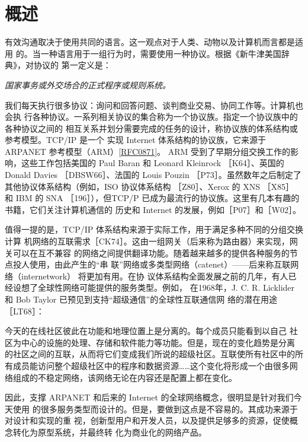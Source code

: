 \chapter{概述}

有效沟通取决于使用共同的语言。这一观点对于人类、动物以及计算机而言都是适用
的。当一种语言用于一组行为时，需要使用一种协议。根据《新牛津美国辞典》，对协议的
第一定义是：
\begin{center}
  \emph{国家事务或外交场合的正式程序或规则系统。}
\end{center}

我们每天执行很多协议：询问和回答问题、谈判商业交易、协同工作等。计算机也会执
行各种协议。一系列相关协议的集合称为一个协议族。指定一个协议族中的各种协议之间的
相互关系并划分需要完成的任务的设计，称协议族的体系结构或参考模型。TCP/IP 是一个
实现 Internet 体系结构的协议族，它来源于 ARPANET
参考模型（ARM）\href{https://www.rfc-editor.org/rfc/rfc0871}{[RFC0871]}。 ARM
受到了早期分组交换工作的影响，这些工作包括美国的 Paul Baran\cite{baran1964distributed} 和
Leonard Kleinrock
［K64］、英国的 Donald Davies ［DBSW66］、法国的 Louis Pouzin ［P73］。虽然数年之后制定了
其他协议体系结构（例如，ISO 协议体系结构 ［Z80］、Xerox 的 XNS ［X85］ 和 IBM 的 SNA
［196］），但TCP/P 已成为最流行的协议族。这里有几本有趣的书籍，它们关注计算机通信的
历史和 Internet 的发展，例如［P07］和［W02］。

值得一提的是，TCP/IP 体系结构来源于实际工作，用于满足多种不同的分组交换计算
机网络的互联需求［CK74］。这由一组网关（后来称为路由器）来实现，网关可以在互不兼容
的网络之间提供翻译功能。随着越来越多的提供各种服务的节点投人使用，由此产生的“串
联”网络或多类型网络（catenet）——后来称互联网络（internetwork） 将更加有用。在协
议体系结构全面发展之前的几年，有人已经设想了全球性网络可能提供的服务类型。例如，
在1968年，J. C. R. Licklider 和 Bob Taylor 已预见到支持“超级通信”的全球性互联通信网
络的潜在用途 ［LT68］：

今天的在线社区彼此在功能和地理位置上是分离的。每个成员只能看到以自己
社区为中心的设施的处理、存储和软件能力等功能。但是，现在的变化趋势是分离
的社区之间的互联，从而将它们变成我们所说的超级社区。互联使所有社区中的所
有成员能访问整个超级社区中的程序和数据资源……这个变化将形成一个由很多网
络组成的不稳定网络，该网络无论在内容还是配置上都在变化。

因此，支撑 ARPANET 和后来的 Internet 的全球网络概念，很明显是针对我们今天使用
的很多服务类型而设计的。但是，要做到这点是不容易的。其成功来源于对设计和实现的重
视，创新型用户和开发人员，以及提供足够多的资源，促使概念转化为原型系统，并最终转
化为商业化的网络产品。

